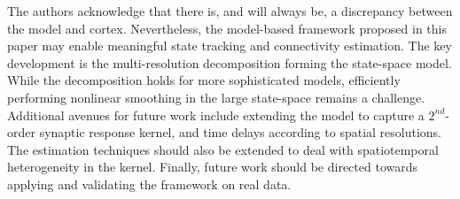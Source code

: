 \documentclass[journal]{IEEEtran}
\newcommand{\cut}[1]{\textcolor{cyan}{#1}}
\begin{document}
The authors acknowledge that there is, and will always be, a discrepancy between the model and cortex. Nevertheless, the model-based framework proposed in this paper may enable meaningful state tracking and connectivity estimation. The key development is the multi-resolution decomposition forming the state-space model. While the decomposition holds for more sophisticated models, efficiently performing nonlinear smoothing in the large state-space remains a challenge. Additional avenues for future work include extending the model to capture a $2^{nd}$-order synaptic response kernel, and time delays according to spatial resolutions. The estimation techniques should also be extended to deal with spatiotemporal heterogeneity in the kernel. Finally, future work should be directed towards applying and validating the framework on real data.




\ifCLASSOPTIONcaptionsoff
  \newpage
\fi

%  
% 


 
\end{document}

